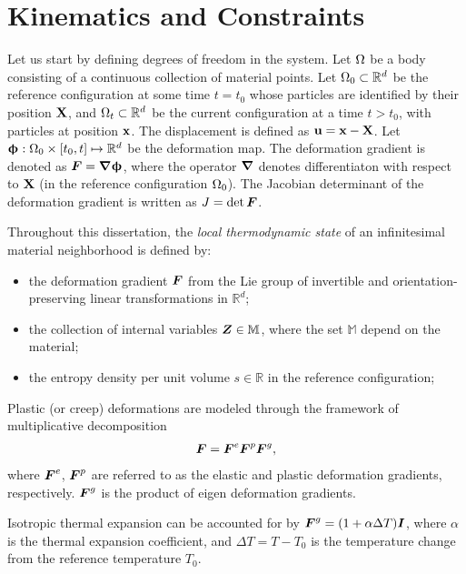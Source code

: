 \section{Kinematics and Constraints}
\label{section: Chapter2/kinematics}

Let us start by defining degrees of freedom in the system. Let $\Omega$ be a body consisting of a continuous collection of material points. Let $\Omega_0 \subset \mathbb{R}^d$ be the reference configuration at some time $t = t_0$ whose particles are identified by their position $\textbf{X}$, and $\Omega_t \subset \mathbb{R}^d$ be the current configuration at a time $t > t_0$, with particles at position $\textbf{x}$. The displacement is defined as $\textbf{u} = \textbf{x} - \textbf{X}$.
Let $\boldsymbol{\upphi}: \Omega_0 \times [t_0, t] \mapsto \mathbb{R}^d$ be the deformation map.
The deformation gradient is denoted as $\boldsymbol{F} = \boldsymbol{\nabla} \boldsymbol{\upphi}$, where the operator $\boldsymbol{\nabla}$ denotes differentiaton with respect to $\textbf{X}$ (in the reference configuration $\Omega_0$). The Jacobian determinant of the deformation gradient is written as $J = \det\boldsymbol{F}$.

Throughout this dissertation, the \emph{local thermodynamic state} of an infinitesimal material neighborhood is defined by:
\begin{itemize}
  \item the deformation gradient $\boldsymbol{F}$ from the Lie group of invertible and orientation-preserving linear transformations in $\mathbb{R}^d$;
  \item the collection of internal variables $\boldsymbol{Z} \in \mathbb{M}$, where the set $\mathbb{M}$ depend on the material;
  \item the entropy density per unit volume $s \in \mathbb{R}$ in the reference configuration;
\end{itemize}

Plastic (or creep) deformations are modeled through the framework of multiplicative decomposition
\begin{align}
  \boldsymbol{F} = \boldsymbol{F}^e \boldsymbol{F}^p \boldsymbol{F}^g,
\end{align}
where $\boldsymbol{F}^e$, $\boldsymbol{F}^p$ are referred to as the elastic and plastic deformation gradients, respectively. $\boldsymbol{F}^g$ is the product of eigen deformation gradients.

\begin{example}
  Isotropic thermal expansion can be accounted for by $\boldsymbol{F}^g = (1+\alpha \Delta T)\boldsymbol{I}$, where $\alpha$ is the thermal expansion coefficient, and $\Delta T = T - T_0$ is the temperature change from the reference temperature $T_0$.
\end{example}

